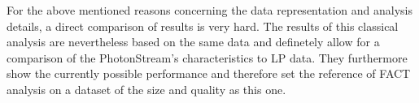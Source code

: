 For the above mentioned reasons concerning the data representation and analysis
details, a direct comparison of results is very hard. The results of this
classical analysis are nevertheless based on the same data and definetely allow
for a comparison of the PhotonStream's characteristics to LP data. They
furthermore show the currently possible performance and therefore set the reference of FACT analysis on a dataset of the size and quality as this one.
